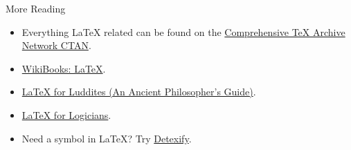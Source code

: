\begin{frame}{More Reading}

\begin{itemize}
\item Everything \LaTeX{} related can be found on the
  \href{http://www.ctan.org/}{Comprehensive \TeX{} Archive Network
    CTAN}.
\item \href{http://en.wikibooks.org/wiki/LaTeX}{WikiBooks: \LaTeX}.
\item
  \href{http://individual.utoronto.ca/williecostello/latex.html}{\LaTeX{}
    for Luddites (An Ancient Philosopher's Guide)}.
\item
  \href{http://www.logicmatters.net/latex-for-logicians/}{\LaTeX{} for
    Logicians}.
\item Need a symbol in \LaTeX? Try
  \href{http://detexify.kirelabs.org/classify.html}{Detexify}.
\end{itemize}

\end{frame}


